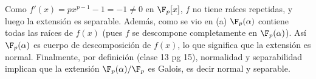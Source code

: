 \begin{solucion}
    Como $f'(x) = p x^{p-1} - 1 = -1 \neq 0$ en $\F_p[x]$, $f$ no tiene raíces repetidas, y luego la extensión es separable. Además, como se vio en (a) $\F_p(\alpha)$ contiene todas las raíces de $f(x)$ (pues $f$ se descompone completamente en $\F_p(\alpha)$). Así $\F_p(\alpha)$ es cuerpo de descomposición de $f(x)$, lo que significa que la extensión es normal. Finalmente, por definición (clase 13 pg 15), normalidad y separabilidad implican que la extensión $\F_p(\alpha)/\F_p$ es Galois, es decir normal y separable.
\end{solucion}
